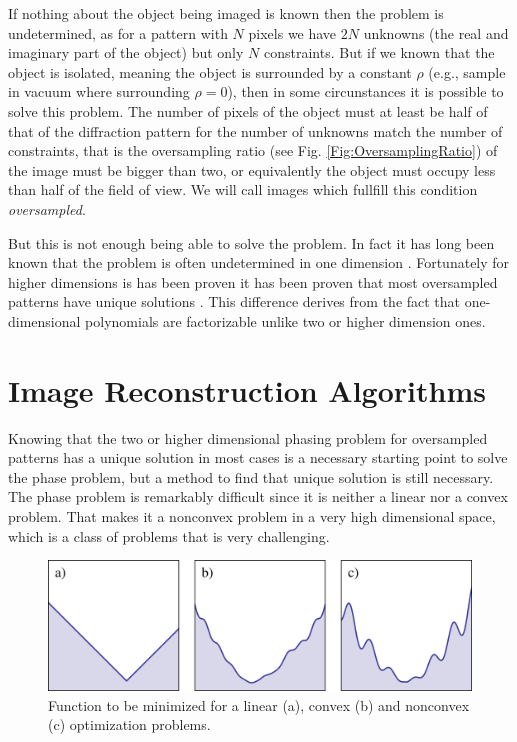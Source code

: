 If nothing about the object being imaged is known then the problem is
undetermined, as for a pattern with $N$ pixels we have $2N$ unknowns (the real and
imaginary part of the object) but only $N$ constraints. But if we known that the object is isolated, meaning the
object is surrounded by a constant $\rho$ (e.g., sample in vacuum where
surrounding $\rho = 0$), then in some circunstances it is possible to solve this
problem. The number of pixels of the object must at least be half of that of the
diffraction pattern for the number of unknowns match the number of
constraints, that is the oversampling ratio (see Fig. \ref{Fig:OversamplingRatio}) of the image must be bigger than
two, or equivalently the object must occupy less than half of the field of
view. We will call images which fullfill this condition {\em oversampled}.

But this is not enough being able to solve the problem. In fact it
has long been known that the problem is often undetermined in one dimension
\cite{Walther63}. Fortunately for higher dimensions is has been proven it has
been proven that most oversampled patterns have unique solutions
\cite{Bruck79}. This difference derives from the fact that one-dimensional
polynomials are factorizable unlike two or higher dimension ones.

\section{Image Reconstruction Algorithms}

Knowing that the two or higher dimensional phasing problem for oversampled
patterns has a unique solution in most cases is a necessary starting point to
solve the phase problem, but a method to find that unique solution is still
necessary. The phase problem is remarkably difficult since it is neither a
linear nor a convex problem. That makes it a nonconvex problem in a very high
dimensional space, which is a class of problems that is very challenging.

\begin{figure}[h]
  \centering
  \includegraphics[width=1 \columnwidth]{convexity.png}
  \caption{Function to be minimized for a linear (a), convex (b) and nonconvex
    (c) optimization problems.}
  \label{Fig:Convexity}
\end{figure}

